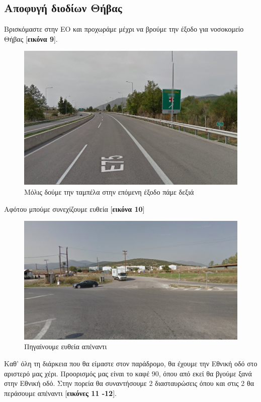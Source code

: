 \begin{center}
\section*{Αποφυγή διοδίων Θήβας}
\end{center}
Βρισκόμαστε στην ΕΟ και προχωράμε μέχρι να βρούμε την έξοδο για νοσοκομείο Θήβας [\textbf{εικόνα 9}].
\begin{figure}[hbp!]
	\centering
		\includegraphics[width=\textwidth]{images/athina-lamia/thiva/thiva1.PNG}
			\caption{Μόλις δούμε την ταμπέλα στην επόμενη έξοδο πάμε δεξιά}
\end{figure}
Αφότου μπούμε συνεχίζουμε ευθεία [\textbf{εικόνα 10}]
\begin{figure}[hbp!]
	\centering
		\includegraphics[width=\textwidth]{images/athina-lamia/thiva/thiva2.PNG}
			\caption{Πηγαίνουμε ευθεία απέναντι}
\end{figure}
\newpage
Καθ' όλη τη διάρκεια που θα είμαστε στον παράδρομο, θα έχουμε την Εθνική οδό στο αριστερό μας χέρι. Προορισμός μας είναι το καφέ 90, όπου από εκεί θα βγούμε ξανά στην Εθνική οδό. Στην πορεία θα συναντήσουμε 2 διασταυρώσεις όπου και στις 2 θα περάσουμε απέναντι [\textbf{εικόνες 11 -12}]. 
